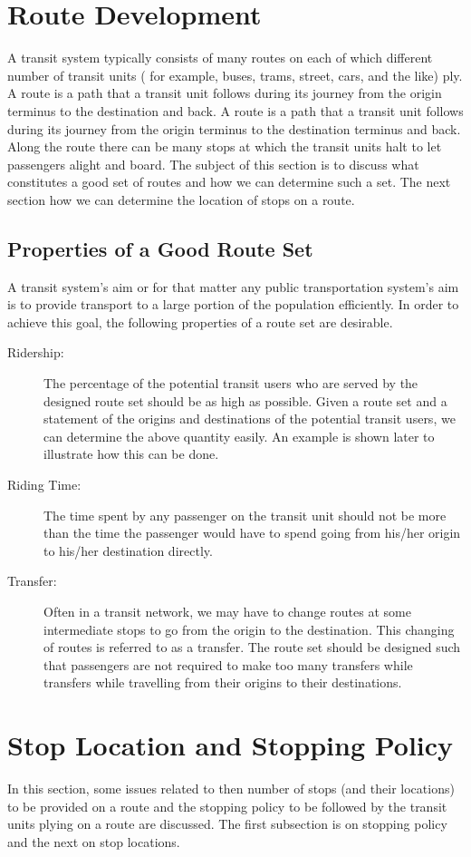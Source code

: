 \section{Route Development}
A transit system typically consists of many routes on each of which different number of transit units ( for example, buses, trams, street, cars, and the like) ply. A route is a path that a transit unit follows during its journey from the origin terminus to the destination and back. A route is a path that a transit unit follows during its journey from the origin terminus to the destination terminus and back. Along the route there can be many stops at which the transit units halt to let passengers alight and board. The subject of this section is to discuss what constitutes a good set of routes and how we can determine such a set. The next section how we can determine the location of stops on a route.
\subsection{Properties of a Good Route Set}
A transit system's aim or for that matter any public transportation system's aim is to provide transport to a large portion of the population efficiently. In order to achieve this goal, the following properties of a route set are desirable.
\begin{description}
	\item [Ridership:] The percentage of the potential transit users who are served by the designed route set should be as high as possible. Given a route set and a statement of the origins and destinations of the potential transit users, we can determine the above quantity easily. An example is shown later to illustrate how this can be done.
	\item [Riding Time:] The time spent by any passenger on the transit unit should not be more than the time the passenger would have to spend going from his/her origin to his/her destination directly.
	\item [Transfer:] Often in a transit network, we may have to change routes at some intermediate stops to go from the origin to the destination. This changing of routes is referred to as a transfer. The route set should be designed such that passengers are not required to make too many transfers while transfers while travelling from their origins to their destinations.
\end{description}
%
\section{Stop Location and Stopping Policy}
In this section, some issues related to then number of stops (and their locations) to be provided on a route and the stopping policy to be followed by the transit units plying on a route are discussed. The first subsection is on stopping policy and the next on stop locations.
